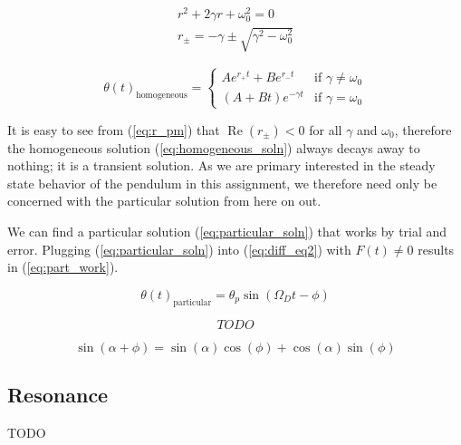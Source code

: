 \documentclass[notitlepage,aps,prd,nofootinbib]{revtex4-1}
\begin{document}
\begin{gather}
r^2 + 2 \gamma r + \omega_{0}^2 = 0 \label{eq:characteristic_eq} \\
r_{\pm} = -\gamma \pm \sqrt{\gamma^2 - \omega_{0}^2} \label{eq:r_pm}
\end{gather}

\begin{equation} \label{eq:homogeneous_soln}
\theta\left(t\right)_{\text{homogeneous}} =
\begin{cases}
A e^{r_{+} t} + B e^{r_{-} t} & \text{if } \gamma \neq \omega_{0} \\
\left(A + B t\right) e^{-\gamma t} & \text{if } \gamma = \omega_{0}
\end{cases}
\end{equation}

It is easy to see from (\ref{eq:r_pm}) that $\operatorname{Re}\left(r_{\pm}\right) < 0$ for all $\gamma$ and $\omega_{0}$, therefore the homogeneous solution (\ref{eq:homogeneous_soln}) always decays away to nothing; it is a transient solution. As we are primary interested in the steady state behavior of the pendulum in this assignment, we therefore need only be concerned with the particular solution from here on out.

We can find a particular solution (\ref{eq:particular_soln}) that works by trial and error. Plugging (\ref{eq:particular_soln}) into (\ref{eq:diff_eq2}) with $F\left(t\right) \neq 0$ results in (\ref{eq:part_work}).

\begin{equation} \label{eq:particular_soln}
\theta\left(t\right)_{\text{particular}} = \theta_{p} \sin\left(\Omega_{D} t - \phi\right)
\end{equation}

\begin{equation} \label{eq:part_work}
TODO
\end{equation}

\begin{equation} \label{eq:trig_identity}
\sin\left(\alpha + \phi\right) = \sin\left(\alpha\right) \cos\left(\phi\right) + \cos\left(\alpha\right) \sin\left(\phi\right)
\end{equation}


\subsection{Resonance}
\label{subsec:resonance}
TODO
\end{document}
